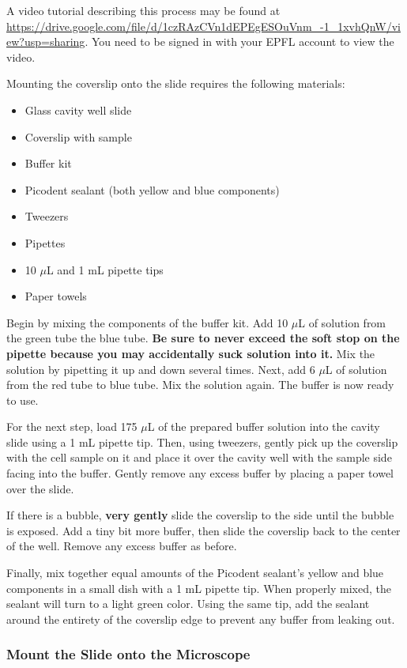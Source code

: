 \documentclass[10pt,a4paper,oneside]{book}
\begin{document}
A video tutorial describing this process may be found at \url{https://drive.google.com/file/d/1czRAzCVn1dEPEgESOuVnm_-1_1xvhQnW/view?usp=sharing}. You need to be signed in with your EPFL account to view the video.

Mounting the coverslip onto the slide requires the following materials:

\begin{itemize}
    \item{Glass cavity well slide}
    \item{Coverslip with sample}
    \item{Buffer kit}
    \item{Picodent sealant (both yellow and blue components)}
    \item{Tweezers}
    \item{Pipettes}
    \item{10 $\mu$L and 1 mL pipette tips}
    \item{Paper towels}
\end{itemize}

Begin by mixing the components of the buffer kit. Add 10 $\mu$L of solution from the green tube the blue tube. \textbf{Be sure to never exceed the soft stop on the pipette because you may accidentally suck solution into it.} Mix the solution by pipetting it up and down several times. Next, add 6 $\mu$L of solution from the red tube to blue tube. Mix the solution again. The buffer is now ready to use.

For the next step, load 175 $\mu$L of the prepared buffer solution into the cavity slide using a 1 mL pipette tip. Then, using tweezers, gently pick up the coverslip with the cell sample on it and place it over the cavity well with the sample side facing into the buffer. Gently remove any excess buffer by placing a paper towel over the slide.

If there is a bubble, \textbf{very gently} slide the coverslip to the side until the bubble is exposed. Add a tiny bit more buffer, then slide the coverslip back to the center of the well. Remove any excess buffer as before.

Finally, mix together equal amounts of the Picodent sealant's yellow and blue components in a small dish with a 1 mL pipette tip. When properly mixed, the sealant will turn to a light green color. Using the same tip, add the sealant around the entirety of the coverslip edge to prevent any buffer from leaking out.

\subsubsection{Mount the Slide onto the Microscope}
\end{document}
